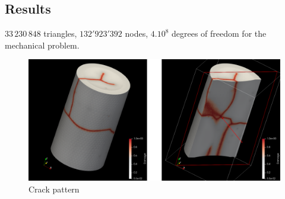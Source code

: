 \subsection{Results}

\(33\,230\,848\) triangles, \(132'923'392\) nodes, \(4.10^8\) degrees of freedom for the mechanical problem.


\begin{figure}[H]
  \centering
  \includegraphics[width=10.cm]{../chapter_003_ef_micromorphic/figures/FuelPelletCracking-results.pdf}
  \caption{Crack pattern}
\end{figure}
